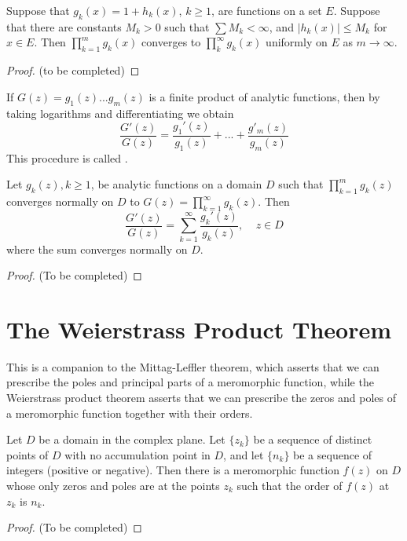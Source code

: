 \documentclass[12pt, a4paper, oneside, openright, titlepage]{book}
\begin{document}
\begin{thm}
    Suppose that $g_k(x) = 1+h_k(x)$, $k \geq 1$, are functions on a set $E$. Suppose that there are constants $M_k > 0$ such that $\sum M_k < \infty$, and $|h_k(x)| \leq M_k$ for $x \in E$. Then $\prod_{k=1}^mg_k(x)$ converges to $\prod_k^{\infty}g_k(x)$ uniformly on $E$ as $m\rightarrow \infty$.
\end{thm}
\begin{proof}
    (to be completed)
\end{proof}

If $G(z) = g_1(z)...g_m(z)$ is a finite product of analytic functions, then by taking logarithms and differentiating we obtain\begin{equation*}
    \frac{G'(z)}{G(z)} = \frac{g_1'(z)}{g_1(z)} + ... + \frac{g'_m(z)}{g_m(z)}
\end{equation*}
This procedure is called .

\begin{thm}
    Let $g_k(z), k \geq 1$, be analytic functions on a domain $D$ such that $\prod_{k=1}^mg_k(z)$ converges normally on $D$ to $G(z) = \prod_{k=1}^{\infty}g_k(z)$. Then \begin{equation*}
        \frac{G'(z)}{G(z)} = \sum_{k=1}^{\infty}\frac{g_k'(z)}{g_k(z)},\;\;\;\;z \in D
    \end{equation*}
    where the sum converges normally on $D$.
\end{thm}
\begin{proof}
    (To be completed)
\end{proof}



\section{The Weierstrass Product Theorem}

This is a companion to the Mittag-Leffler theorem, which asserts that we can prescribe the poles and principal parts of a meromorphic function, while the Weierstrass product theorem asserts that we can prescribe the zeros and poles of a meromorphic function together with their orders.

\begin{namthm}
    Let $D$ be a domain in the complex plane. Let $\{z_k\}$ be a sequence of distinct points of $D$ with no accumulation point in $D$, and let $\{n_k\}$ be a sequence of integers (positive or negative). Then there is a meromorphic function $f(z)$ on $D$ whose only zeros and poles are at the points $z_k$ such that the order of $f(z)$ at $z_k$ is $n_k$.
\end{namthm}
\begin{proof}
    (To be completed)
\end{proof}
\end{document}
